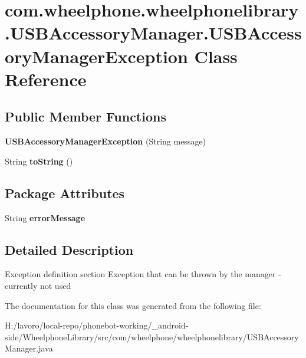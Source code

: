 \section{com.\-wheelphone.\-wheelphonelibrary.\-U\-S\-B\-Accessory\-Manager.\-U\-S\-B\-Accessory\-Manager\-Exception \-Class \-Reference}
\label{classcom_1_1wheelphone_1_1wheelphonelibrary_1_1_u_s_b_accessory_manager_1_1_u_s_b_accessory_manager_exception}
\subsection*{\-Public \-Member \-Functions}
\begin{DoxyCompactItemize}
\item 
{\bfseries \-U\-S\-B\-Accessory\-Manager\-Exception} (\-String message)\label{classcom_1_1wheelphone_1_1wheelphonelibrary_1_1_u_s_b_accessory_manager_1_1_u_s_b_accessory_manager_exception_a2377a8c2e790d508c86f6aa66b83b733}

\item 
\-String {\bfseries to\-String} ()\label{classcom_1_1wheelphone_1_1wheelphonelibrary_1_1_u_s_b_accessory_manager_1_1_u_s_b_accessory_manager_exception_a98bd4315975a57c27210d946e6510dc1}

\end{DoxyCompactItemize}
\subsection*{\-Package \-Attributes}
\begin{DoxyCompactItemize}
\item 
\-String {\bfseries error\-Message}\label{classcom_1_1wheelphone_1_1wheelphonelibrary_1_1_u_s_b_accessory_manager_1_1_u_s_b_accessory_manager_exception_af1260502c4fea5a8ab75f211acfe412a}

\end{DoxyCompactItemize}


\subsection{\-Detailed \-Description}
\-Exception definition section \-Exception that can be thrown by the manager -\/ currently not used 

\-The documentation for this class was generated from the following file\-:\begin{DoxyCompactItemize}
\item 
\-H\-:/lavoro/local-\/repo/phonebot-\/working/\-\_\-android-\/side/\-Wheelphone\-Library/src/com/wheelphone/wheelphonelibrary/\-U\-S\-B\-Accessory\-Manager.\-java\end{DoxyCompactItemize}
